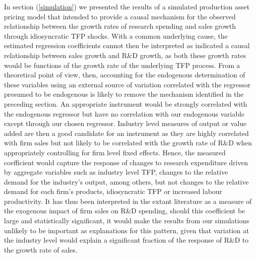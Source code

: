 \documentclass{_latex/house}
\begin{document}
In section (\ref{simulation}) we presented the results of a simulated production asset pricing model that intended to provide a causal mechanism for the observed relationship between the growth rates of research spending and sales growth through idiosyncratic TFP shocks. With a common underlying cause, the estimated regression coefficients cannot then be interpreted as indicated a causal relationship between sales growth and R\&D growth, as both these growth rates would be functions of the growth rate of the underlying TFP process. From a theoretical point of view, then, accounting for the endogenous determination of these variables using an external source of variation correlated with the regressor presumed to be endogenous is likely to remove the mechanism identified in the preceding section. An appropriate instrument would be strongly correlated with the endogenous regressor but have no correlation with our endogenous variable except through our chosen regressor. Industry level measures of output or value added are then a good candidate for an instrument as they are highly correlated with firm sales but not likely to be correlated with the growth rate of R\&D when appropriately controlling for firm level fixed effects. Hence, the measured coefficient would capture the response of changes to research expenditure driven by aggregate variables such as industry level TFP, changes to the relative demand for the industry's output, among others, but not changes to the relative demand for each firm's products, idiosyncratic TFP or increased labour productivity. It has thus been interpreted in the extant literature as a measure of the exogenous impact of firm sales on R\&D spending, should this coefficient be large and statistically significant, it would make the results from our simulations unlikely to be important as explanations for this pattern, given that variation at the industry level would explain a significant fraction of the response of R\&D to the growth rate of sales.
\end{document}
